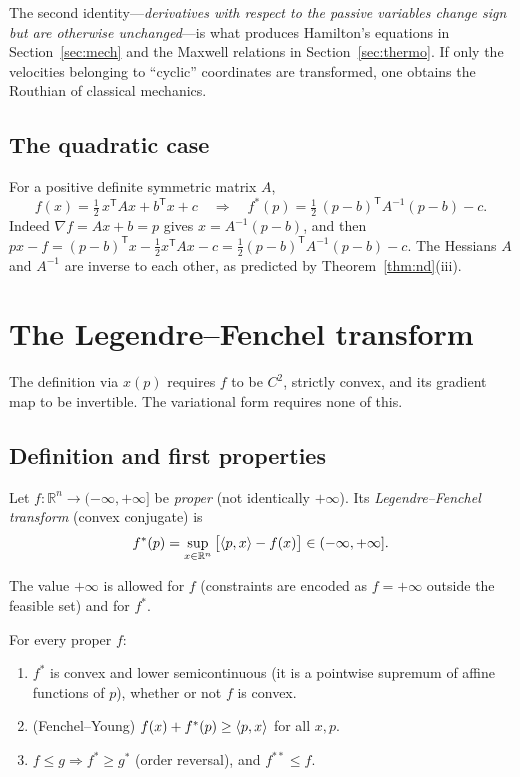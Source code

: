 The second identity---\emph{derivatives with respect to the passive variables
change sign but are otherwise unchanged}---is what produces Hamilton's
equations in Section~\ref{sec:mech} and the Maxwell relations in
Section~\ref{sec:thermo}.  If only the velocities belonging to ``cyclic''
coordinates are transformed, one obtains the Routhian of classical mechanics.

\subsection{The quadratic case}

For a positive definite symmetric matrix $A$,
\[
  f(x)=\tfrac12\,x^{\mathsf T}Ax+b^{\mathsf T}x+c
  \quad\Longrightarrow\quad
  f^*(p)=\tfrac12\,(p-b)^{\mathsf T}A^{-1}(p-b)-c .
\]
Indeed $\nabla f=Ax+b=p$ gives $x=A^{-1}(p-b)$, and then
$px-f=(p-b)^{\mathsf T}x-\tfrac12x^{\mathsf T}Ax-c=\tfrac12(p-b)^{\mathsf T}A^{-1}(p-b)-c$.
The Hessians $A$ and $A^{-1}$ are inverse to each other, as predicted by
Theorem~\ref{thm:nd}(iii).

\section{The Legendre--Fenchel transform}\label{sec:fenchel}

The definition via $x(p)$ requires $f$ to be $C^2$, strictly convex, and its
gradient map to be invertible.  The variational form requires none of this.

\subsection{Definition and first properties}

\begin{definition}
Let $f\colon\mathbb{R}^n\to(-\infty,+\infty]$ be \emph{proper} (not identically
$+\infty$).  Its \emph{Legendre--Fenchel transform} (convex conjugate) is
\[
  f^*(p)=\sup_{x\in\mathbb{R}^n}\,\bigl[\langle p,x\rangle-f(x)\bigr]\in(-\infty,+\infty].
\]
\end{definition}

The value $+\infty$ is allowed for $f$ (constraints are encoded as
$f=+\infty$ outside the feasible set) and for $f^*$.

\begin{proposition}\label{prop:fenchelbasic}
For every proper $f$:
\begin{enumerate}[label=(\alph*),nosep]
  \item $f^*$ is convex and lower semicontinuous (it is a pointwise supremum
        of affine functions of $p$), whether or not $f$ is convex.
  \item (Fenchel--Young) $f(x)+f^*(p)\ge\langle p,x\rangle$ for all $x,p$.
  \item $f\le g\Rightarrow f^*\ge g^*$ (order reversal), and $f^{**}\le f$.
\end{enumerate}
\end{proposition}


